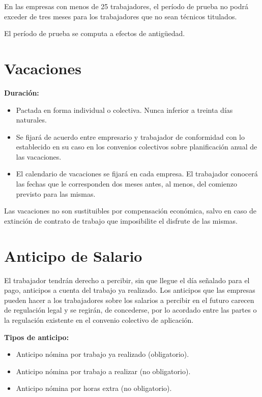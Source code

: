 \documentclass{article}
\begin{document}
	En las empresas con menos de 25 trabajadores, el período de prueba no podrá exceder de tres meses para los trabajadores que no sean técnicos titulados.
	
	El período de prueba se computa a efectos de antigüedad.
	
	\section*{Vacaciones}
	
	\textbf{Duración:}
	
	\begin{itemize}
		\item Pactada en forma individual o colectiva. Nunca inferior a treinta días naturales.
		\item Se fijará de acuerdo entre empresario y trabajador de conformidad con lo establecido en su caso en los convenios colectivos sobre planificación anual de las vacaciones.
		\item El calendario de vacaciones se fijará en cada empresa. El trabajador conocerá las fechas que le corresponden dos meses antes, al menos, del comienzo previsto para las mismas.
	\end{itemize}
	
	Las vacaciones no son sustituibles por compensación económica, salvo en caso de extinción de contrato de trabajo que imposibilite el disfrute de las mismas.
	
	\section*{Anticipo de Salario}
	
	El trabajador tendrán derecho a percibir, sin que llegue el día señalado para el pago, anticipos a cuenta del trabajo ya realizado. Los anticipos que las empresas pueden hacer a los trabajadores sobre los salarios a percibir en el futuro carecen de regulación legal y se regirán, de concederse, por lo acordado entre las partes o la regulación existente en el convenio colectivo de aplicación.
	
	\textbf{Tipos de anticipo:}
	
	\begin{itemize}
		\item \checkmark Anticipo nómina por trabajo ya realizado (obligatorio).
		\item \checkmark Anticipo nómina por trabajo a realizar (no obligatorio).
		\item \checkmark Anticipo nómina por horas extra (no obligatorio).
	\end{itemize}
	
\end{document}
